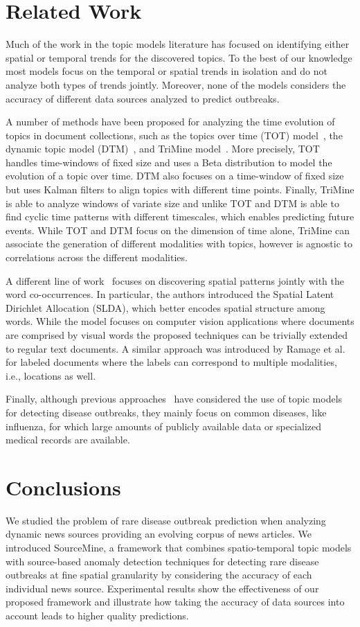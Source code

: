 \documentclass[conference]{IEEEtran}
\newcommand{\fullmodel}{{{\sf SourceMine}}\xspace}
\begin{document}
\section{Related Work}
\label{sec:related_work}
Much of the work in the topic models literature has focused on identifying either spatial or temporal trends for the discovered topics. To the best of our knowledge most models focus on the temporal or spatial trends in isolation and do not analyze both types of trends jointly.  Moreover, none of the models considers the accuracy of different data sources analyzed to predict outbreaks.

A number of methods have been proposed for analyzing the time evolution of topics in document collections, such as the topics over time (TOT) model~\cite{wang:2006}, the dynamic topic model (DTM)~\cite{blei:2006}, and TriMine model~\cite{matsubara:2012}.  More precisely, TOT handles time-windows of fixed size and uses a Beta distribution to model the evolution of a topic over time. DTM  also focuses on a time-window of fixed size but uses Kalman filters to align topics with different time points. Finally, TriMine is able to analyze windows of variate size and unlike TOT and DTM is able to find cyclic time patterns with different timescales, which enables predicting future events. While TOT and DTM focus on the dimension of time alone, TriMine can associate the generation of different modalities with topics, however is agnostic to correlations across the different modalities.

A different line of work~\cite{wang:2007} focuses on discovering spatial patterns jointly with the word co-occurrences. In particular, the authors introduced the Spatial Latent Dirichlet Allocation (SLDA), which better encodes spatial structure among words. While the model focuses on computer vision applications where documents are comprised by visual words the proposed techniques can be trivially extended to regular text documents. A similar approach was introduced by Ramage et al.~\cite{ramage:2009} for labeled documents where the labels can correspond to multiple modalities, i.e., locations as well.

Finally, although previous approaches~\cite{paul:11, sadilek:2012, rider:2013} have considered the use of topic models for detecting disease outbreaks, they mainly focus on common diseases, like influenza, for which large amounts of publicly available data or specialized medical records are available. 

\section{Conclusions}
\label{sec:conclusion}
We studied the problem of rare disease outbreak prediction when analyzing dynamic news sources providing an evolving corpus of news articles. We introduced \fullmodel, a framework that combines spatio-temporal topic models with source-based anomaly detection techniques for detecting rare disease outbreaks at fine spatial granularity by considering the accuracy of each individual news source. Experimental results show the effectiveness of our proposed framework and illustrate how taking the accuracy of data sources into account leads to higher quality predictions.
\end{document}
